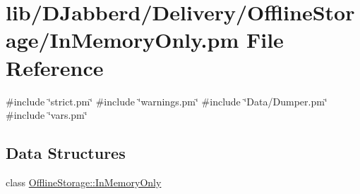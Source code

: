 \hypertarget{_in_memory_only_8pm}{
\section{lib/\-D\-Jabberd/\-Delivery/\-Offline\-Storage/\-In\-Memory\-Only.pm \-File \-Reference}
\label{_in_memory_only_8pm}
}
{\ttfamily \#include \char`\"{}strict.\-pm\char`\"{}}\*
{\ttfamily \#include \char`\"{}warnings.\-pm\char`\"{}}\*
{\ttfamily \#include \char`\"{}\-Data/\-Dumper.\-pm\char`\"{}}\*
{\ttfamily \#include \char`\"{}vars.\-pm\char`\"{}}\*
\subsection*{\-Data \-Structures}
\begin{DoxyCompactItemize}
\item 
class \hyperlink{class_d_jabberd_1_1_delivery_1_1_offline_storage_1_1_in_memory_only}{\-Offline\-Storage\-::\-In\-Memory\-Only}
\end{DoxyCompactItemize}

